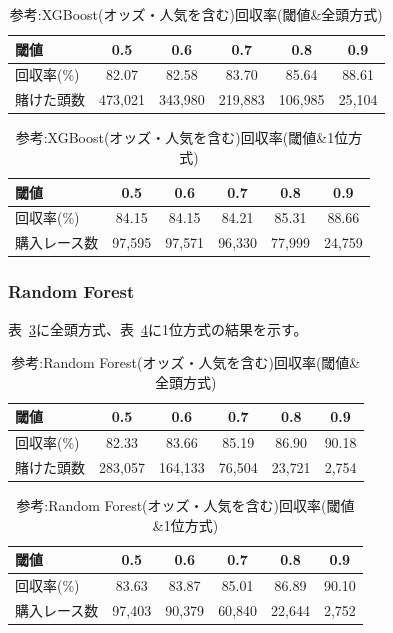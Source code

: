 \documentclass[dvipdfmx, a4paper, 11pt, titlepage]{jsarticle}
\begin{document}
\begin{table}[H]
  \centering
  \caption{参考:XGBoost(オッズ・人気を含む)回収率(閾値\&全頭方式)}
  \label{tab:exp6_xgb_odds_all}
  \begin{tabular}{lccccc}
    \toprule
    閾値 & 0.5 & 0.6 & 0.7 & 0.8 & 0.9 \\
    \midrule
    回収率(\%)   & 82.07 & 82.58 & 83.70 & 85.64 & 88.61 \\
    賭けた頭数   & 473{,}021 & 343{,}980 & 219{,}883 & 106{,}985 & 25{,}104 \\
    \bottomrule
  \end{tabular}
\end{table}

\begin{table}[H]
  \centering
  \caption{参考:XGBoost(オッズ・人気を含む)回収率(閾値\&1位方式)}
  \label{tab:exp6_xgb_odds_top1}
  \begin{tabular}{lccccc}
    \toprule
    閾値 & 0.5 & 0.6 & 0.7 & 0.8 & 0.9 \\
    \midrule
    回収率(\%)     & 84.15 & 84.15 & 84.21 & 85.31 & 88.66 \\
    購入レース数   & 97{,}595 & 97{,}571 & 96{,}330 & 77{,}999 & 24{,}759 \\
    \bottomrule
  \end{tabular}
\end{table}

\subsubsection{Random Forest}

表~\ref{tab:exp6_rf_odds_all}に全頭方式、表~\ref{tab:exp6_rf_odds_top1}に1位方式の結果を示す。

\begin{table}[H]
  \centering
  \caption{参考:Random Forest(オッズ・人気を含む)回収率(閾値\&全頭方式)}
  \label{tab:exp6_rf_odds_all}
  \begin{tabular}{lccccc}
    \toprule
    閾値 & 0.5 & 0.6 & 0.7 & 0.8 & 0.9 \\
    \midrule
    回収率(\%)   & 82.33 & 83.66 & 85.19 & 86.90 & 90.18 \\
    賭けた頭数   & 283{,}057 & 164{,}133 & 76{,}504 & 23{,}721 & 2{,}754 \\
    \bottomrule
  \end{tabular}
\end{table}

\begin{table}[H]
  \centering
  \caption{参考:Random Forest(オッズ・人気を含む)回収率(閾値\&1位方式)}
  \label{tab:exp6_rf_odds_top1}
  \begin{tabular}{lccccc}
    \toprule
    閾値 & 0.5 & 0.6 & 0.7 & 0.8 & 0.9 \\
    \midrule
    回収率(\%)     & 83.63 & 83.87 & 85.01 & 86.89 & 90.10 \\
    購入レース数   & 97{,}403 & 90{,}379 & 60{,}840 & 22{,}644 & 2{,}752 \\
    \bottomrule
  \end{tabular}
\end{table}
\end{document}
